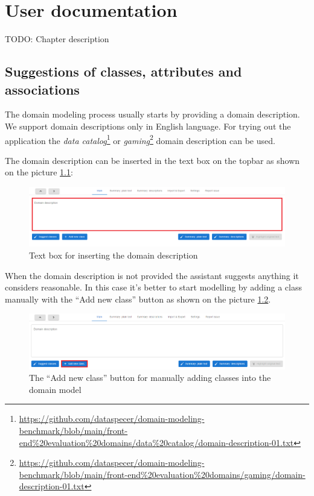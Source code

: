 \chapter{User documentation}

TODO: Chapter description

\section{Suggestions of classes, attributes and associations}
The domain modeling process usually starts by providing a domain description. We support domain descriptions only in English language. For trying out the application the \textit{data catalog}\footnote{\url{https://github.com/dataspecer/domain-modeling-benchmark/blob/main/front-end\%20evaluation\%20domains/data\%20catalog/domain-description-01.txt}} or \textit{gaming}\footnote{\url{https://github.com/dataspecer/domain-modeling-benchmark/blob/main/front-end\%20evaluation\%20domains/gaming/domain-description-01.txt}} domain description can be used.

The domain description can be inserted in the text box on the topbar as shown on the picture \ref{fig:domain-description-text-box}:

\begin{figure}[!h]
    \includegraphics[scale=0.35]{../docs/images/frontend/insert-domain-description.png}
    \caption{\centering Text box for inserting the domain description}
    \label{fig:domain-description-text-box}
\end{figure}

When the domain description is not provided the assistant suggests anything it considers reasonable. In this case it's better to start modelling by adding a class manually with the ``Add new class'' button as shown on the picture \ref{fig:add_new_class}.

\begin{figure}[!h]
    \includegraphics[scale=0.36]{../docs/images/frontend/add-new-class-manually.png}
    \caption{\centering The ``Add new class'' button for manually adding classes into the domain model}
    \label{fig:add_new_class}
\end{figure}

